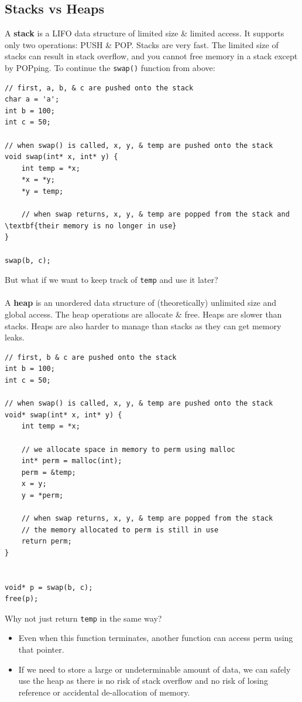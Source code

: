 \documentclass[a4paper,11pt]{article}
\begin{document}
\subsection{Stacks vs Heaps}
A \textbf{stack} is a LIFO data structure of limited size \& limited access.
It supports only two operations: PUSH \& POP.
Stacks are very fast.
The limited size of stacks can result in stack overflow, and you cannot free memory in a stack except by POPping.
To continue the \verb|swap()| function from above:
\begin{verbatim}
// first, a, b, & c are pushed onto the stack
char a = 'a';
int b = 100;
int c = 50;

// when swap() is called, x, y, & temp are pushed onto the stack
void swap(int* x, int* y) {
    int temp = *x;
    *x = *y;
    *y = temp;

    // when swap returns, x, y, & temp are popped from the stack and \textbf{their memory is no longer in use}
}

swap(b, c);
\end{verbatim}

But what if we want to keep track of \verb|temp| and use it later?
\\\\ 
A \textbf{heap} is an unordered data structure of (theoretically) unlimited size and global access. 
The heap operations are allocate \& free.
Heaps are slower than stacks.
Heaps are also harder to manage than stacks as they can get memory leaks.
\begin{verbatim}
// first, b & c are pushed onto the stack
int b = 100;
int c = 50;

// when swap() is called, x, y, & temp are pushed onto the stack
void* swap(int* x, int* y) {
    int temp = *x;

    // we allocate space in memory to perm using malloc
    int* perm = malloc(int);
    perm = &temp;
    x = y;
    y = *perm;

    // when swap returns, x, y, & temp are popped from the stack
    // the memory allocated to perm is still in use 
    return perm;
}


void* p = swap(b, c);
free(p);
\end{verbatim}

Why not just return \verb|temp| in the same way?
\begin{itemize}
    \item   Even when this function terminates, another function can access perm using that pointer.
    \item   If we need to store a large or undeterminable amount of data, we can safely use the heap as there is no risk 
            of stack overflow and no risk of losing reference or accidental de-allocation of memory.
\end{itemize}
\end{document}

